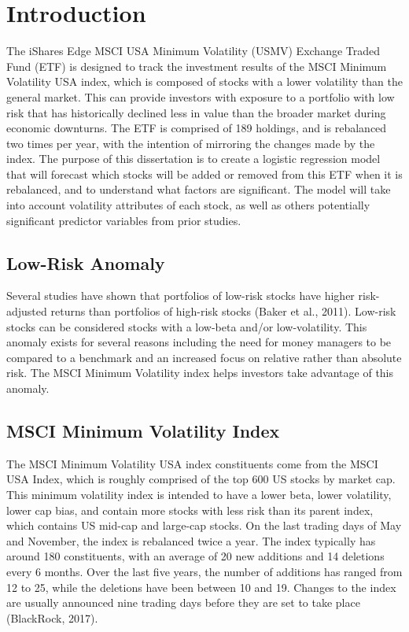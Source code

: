 \documentclass[12pt,twoside]{reedthesis}
\theoremstyle{definition}
\theoremstyle{definition}
\theoremstyle{definition}
\theoremstyle{remark}
\begin{document}
\mainmatter %
\pagestyle{fancyplain} %

\chapter{Introduction}\label{introduction}

The iShares Edge MSCI USA Minimum Volatility (USMV) Exchange Traded Fund
(ETF) is designed to track the investment results of the MSCI Minimum
Volatility USA index, which is composed of stocks with a lower
volatility than the general market. This can provide investors with
exposure to a portfolio with low risk that has historically declined
less in value than the broader market during economic downturns. The ETF
is comprised of 189 holdings, and is rebalanced two times per year, with
the intention of mirroring the changes made by the index. The purpose of
this dissertation is to create a logistic regression model that will
forecast which stocks will be added or removed from this ETF when it is
rebalanced, and to understand what factors are significant. The model
will take into account volatility attributes of each stock, as well as
others potentially significant predictor variables from prior studies.

\section{Low-Risk Anomaly}\label{low-risk-anomaly}

Several studies have shown that portfolios of low-risk stocks have
higher risk-adjusted returns than portfolios of high-risk stocks (Baker
et al., 2011). Low-risk stocks can be considered stocks with a low-beta
and/or low-volatility. This anomaly exists for several reasons including
the need for money managers to be compared to a benchmark and an
increased focus on relative rather than absolute risk. The MSCI Minimum
Volatility index helps investors take advantage of this anomaly.

\section{MSCI Minimum Volatility
Index}\label{msci-minimum-volatility-index}

The MSCI Minimum Volatility USA index constituents come from the MSCI
USA Index, which is roughly comprised of the top 600 US stocks by market
cap. This minimum volatility index is intended to have a lower beta,
lower volatility, lower cap bias, and contain more stocks with less risk
than its parent index, which contains US mid-cap and large-cap stocks.
On the last trading days of May and November, the index is rebalanced
twice a year. The index typically has around 180 constituents, with an
average of 20 new additions and 14 deletions every 6 months. Over the
last five years, the number of additions has ranged from 12 to 25, while
the deletions have been between 10 and 19. Changes to the index are
usually announced nine trading days before they are set to take place
(BlackRock, 2017).
\end{document}
